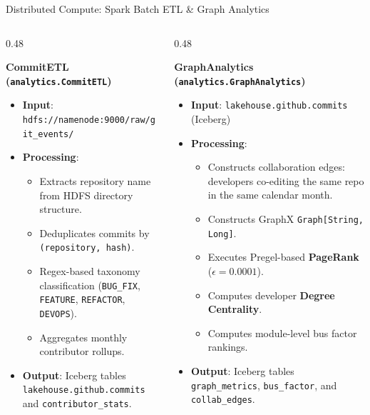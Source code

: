 \documentclass[aspectratio=169, 10pt]{beamer}
\begin{document}
\begin{frame}{Distributed Compute: Spark Batch ETL \& Graph Analytics}
  \begin{columns}[T]
    \begin{column}{0.48\textwidth}
      \begin{block}{\textbf{CommitETL (\texttt{analytics.CommitETL})}}
        \begin{itemize}
          \item \textbf{Input}: \texttt{hdfs://namenode:9000/raw/git\_events/}
          \item \textbf{Processing}:
            \begin{itemize}
              \item Extracts repository name from HDFS directory structure.
              \item Deduplicates commits by \texttt{(repository, hash)}.
              \item Regex-based taxonomy classification (\texttt{BUG\_FIX}, \texttt{FEATURE}, \texttt{REFACTOR}, \texttt{DEVOPS}).
              \item Aggregates monthly contributor rollups.
            \end{itemize}
          \item \textbf{Output}: Iceberg tables \texttt{lakehouse.github.commits} and \texttt{contributor\_stats}.
        \end{itemize}
      \end{block}
    \end{column}

    \begin{column}{0.48\textwidth}
      \begin{block}{\textbf{GraphAnalytics (\texttt{analytics.GraphAnalytics})}}
        \begin{itemize}
          \item \textbf{Input}: \texttt{lakehouse.github.commits} (Iceberg)
          \item \textbf{Processing}:
            \begin{itemize}
              \item Constructs collaboration edges: developers co-editing the same repo in the same calendar month.
              \item Constructs GraphX \texttt{Graph[String, Long]}.
              \item Executes Pregel-based \textbf{PageRank} ($\epsilon=0.0001$).
              \item Computes developer \textbf{Degree Centrality}.
              \item Computes module-level bus factor rankings.
            \end{itemize}
          \item \textbf{Output}: Iceberg tables \texttt{graph\_metrics}, \texttt{bus\_factor}, and \texttt{collab\_edges}.
        \end{itemize}
      \end{block}
    \end{column}
  \end{columns}
\end{frame}
\end{document}
